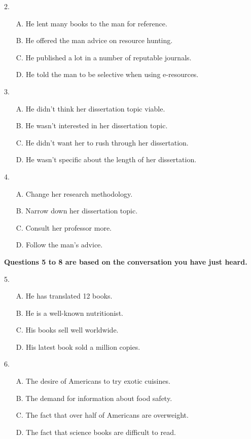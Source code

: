\documentclass[UTF8,11pt]{ctexart}
\begin{document}
2.


\begin{itemize}[leftmargin=2em,itemsep=.2em,topsep=.4em]\item[A.] He lent many books to the man for reference.
\item[B.] He offered the man advice on resource hunting.
\item[C.] He published a lot in a number of reputable journals.
\item[D.] He told the man to be selective when using e-resources.
\end{itemize}

3.


\begin{itemize}[leftmargin=2em,itemsep=.2em,topsep=.4em]\item[A.] He didn’t think her dissertation topic viable.
\item[B.] He wasn’t interested in her dissertation topic.
\item[C.] He didn’t want her to rush through her dissertation.
\item[D.] He wasn’t specific about the length of her dissertation.
\end{itemize}

4.


\begin{itemize}[leftmargin=2em,itemsep=.2em,topsep=.4em]\item[A.] Change her research methodology.
\item[B.] Narrow down her dissertation topic.
\item[C.] Consult her professor more.
\item[D.] Follow the man’s advice.
\end{itemize}

\textbf{Questions 5 to 8 are based on the conversation you have just heard.}


5.


\begin{itemize}[leftmargin=2em,itemsep=.2em,topsep=.4em]\item[A.] He has translated 12 books.
\item[B.] He is a well-known nutritionist.
\item[C.] His books sell well worldwide.
\item[D.] His latest book sold a million copies.
\end{itemize}

6.


\begin{itemize}[leftmargin=2em,itemsep=.2em,topsep=.4em]\item[A.] The desire of Americans to try exotic cuisines.
\item[B.] The demand for information about food safety.
\item[C.] The fact that over half of Americans are overweight.
\item[D.] The fact that science books are difficult to read.
\end{itemize}
\end{document}
